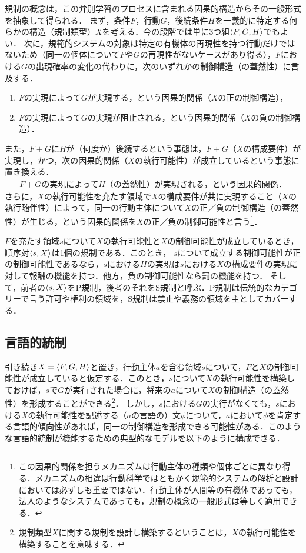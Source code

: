 規制の概念は，この弁別学習のプロセスに含まれる因果的構造からその一般形式を抽象して得られる．
まず，条件$F$，行動$G$，後続条件$H$を一義的に特定する何らかの構造（規制類型）$X$を考える．今の段階では単に3つ組$\langle F,G,H \rangle$でもよい．
次に，規範的システムの対象は特定の有機体の再現性を持つ行動だけではないため（同一の個体について$F$や$G$の再現性がないケースがあり得る），$F$における$G$の出現確率の変化の代わりに，次のいずれかの制御構造（の蓋然性）に言及する．
\begin{enumerate}[label=(\arabic*)]
    \item $F$の実現によって$G$が実現する，という因果的関係（$X$の正の制御構造），
    \item $F$の実現によって$G$の実現が阻止される，という因果的関係（$X$の負の制御構造）．
\end{enumerate}
また，$F+G$に$H$が（何度か）後続するという事態は，$F+G$（$X$の構成要件）が実現し，かつ，次の因果的関係（$X$の執行可能性）が成立しているという事態に置き換える．
\begin{align*}
    \text{$F+G$の実現によって$H$（の蓋然性）が実現される，という因果的関係．}
\end{align*}
さらに，$X$の執行可能性を充たす領域で$X$の構成要件が共に実現すること（$X$の執行随伴性）によって，同一の行動主体について$X$の正／負の制御構造（の蓋然性）が生じる，という因果的関係を$X$の正／負の制御可能性と言う\footnote{この因果的関係を担うメカニズムは行動主体の種類や個体ごとに異なり得る．メカニズムの相違は行動科学ではともかく規範的システムの解析と設計においては必ずしも重要ではない．行動主体が人間等の有機体であっても，法人のようなシステムであっても，規制の概念の一般形式は等しく適用できる．}．

$F$を充たす領域$s$について$X$の執行可能性と$X$の制御可能性が成立しているとき，順序対$\langle s,X \rangle$は1個の規制である．このとき，
$s$について成立する制御可能性が正の制御可能性であるなら，$s$における$H$の実現は$s$における$X$の構成要件の実現に対して報酬の機能を持つ．他方，負の制御可能性なら罰の機能を持つ．
そして，前者の$\langle s,X \rangle$をP規制，後者のそれをS規制と呼ぶ．P規制は伝統的なカテゴリーで言う許可や権利の領域を，S規制は禁止や義務の領域を主としてカバーする．

\subsection{言語的統制}

引き続き$X=\langle F,G,H \rangle$と置き，行動主体$a$を含む領域$s$について，$F$と$X$の制御可能性が成立していると仮定する．このとき，$s$について$X$の執行可能性を構築しておけば，$s$で$G$が実行された場合に，将来の$a$について$X$の制御構造（の蓋然性）を形成することができる\footnote{規制類型$X$に関する規制を設計し構築するということは，$X$の執行可能性を構築することを意味する．}．
しかし，$s$における$G$の実行がなくても，$s$における$X$の執行可能性を記述する（$a$の言語の）文$\phi$について，$a$において$\phi$を肯定する言語的傾向性があれば，同一の制御構造を形成できる可能性がある．このような言語的統制が機能するための典型的なモデルを以下のように構成できる．

